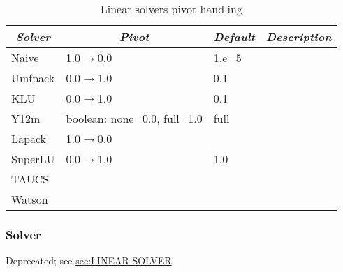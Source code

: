 \begin{table}
\centering
\caption{Linear solvers pivot handling}\label{tab:linear-solvers-pivot}
\begin{tabular}{llll}
\hline
	\multicolumn{1}{c}{\textbf{\emph{Solver}}} &
	\multicolumn{1}{c}{\textbf{\emph{Pivot}}} &
	\multicolumn{1}{c}{\textbf{\emph{Default}}} &
	\multicolumn{1}{c}{\textbf{\emph{Description}}} \\
\hline\hline
	Naive		& 1.0$\rightarrow$0.0		& 1.e$-5$	& \\
	Umfpack 	& 0.0$\rightarrow$1.0 		& 0.1 		& \\
	KLU 		& 0.0$\rightarrow$1.0 		& 0.1 		& \\
	Y12m 		& boolean: none=0.0, full=1.0	& full		& \\
	Lapack		& 1.0$\rightarrow$0.0		&		& \\
	SuperLU		& 0.0$\rightarrow$1.0		& 1.0		& \\
	TAUCS		&				&		& \\
	Watson		&				&		& \\
\hline
\end{tabular}
\end{table}



\subsubsection{Solver}   
Deprecated; see
\hyperref{\kw{linear solver}}{\kw{linear solver} (Section~}{)}{sec:LINEAR-SOLVER}.


